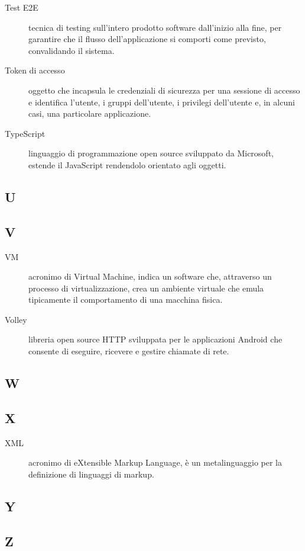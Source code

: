 \documentclass[../manuale-manutentore.tex]{subfiles}
\begin{document}
\begin{description}
    \item[Test E2E] tecnica di testing sull'intero prodotto software dall'inizio alla fine, per garantire che il flusso dell'applicazione si comporti come previsto, convalidando il sistema.
    \item[Token di accesso] oggetto che incapsula le credenziali di sicurezza per una sessione di accesso e identifica l'utente, i gruppi dell'utente, i privilegi dell'utente e, in alcuni casi, una particolare applicazione.
    \item[TypeScript] linguaggio di programmazione open source sviluppato da Microsoft, estende il JavaScript rendendolo orientato agli oggetti.
\end{description}

\subsection{U}

\subsection{V}

\begin{description}
    \item[VM] acronimo di Virtual Machine, indica un software che, attraverso un processo di virtualizzazione, crea un ambiente virtuale che emula tipicamente il comportamento di una macchina fisica.
    \item[Volley] libreria open source HTTP sviluppata per le applicazioni Android che consente di eseguire, ricevere e gestire chiamate di rete.
\end{description}

\subsection{W}

\subsection{X}
\begin{description}
    \item[XML] acronimo di eXtensible Markup Language, è un metalinguaggio per la definizione di linguaggi di markup.
\end{description}

\subsection{Y}

\subsection{Z}
\end{document}
